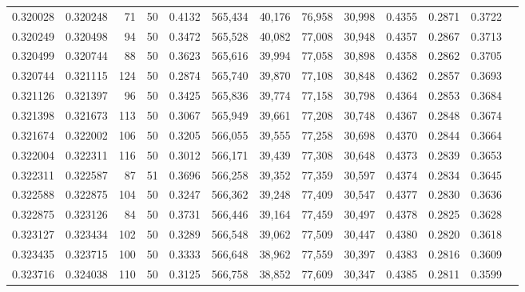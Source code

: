 \begin{tabular}{rrrrrrrrrrrrr}
0.320028 & 0.320248 &    71 &  50 &                                     0.4132 & 565,434 &  40,176 &  76,958 &  30,998 & 0.4355 & 0.2871 & 0.3722 \\
0.320249 & 0.320498 &    94 &  50 &                                     0.3472 & 565,528 &  40,082 &  77,008 &  30,948 & 0.4357 & 0.2867 & 0.3713 \\
0.320499 & 0.320744 &    88 &  50 &                                     0.3623 & 565,616 &  39,994 &  77,058 &  30,898 & 0.4358 & 0.2862 & 0.3705 \\
0.320744 & 0.321115 &   124 &  50 &                                     0.2874 & 565,740 &  39,870 &  77,108 &  30,848 & 0.4362 & 0.2857 & 0.3693 \\
0.321126 & 0.321397 &    96 &  50 &                                     0.3425 & 565,836 &  39,774 &  77,158 &  30,798 & 0.4364 & 0.2853 & 0.3684 \\
0.321398 & 0.321673 &   113 &  50 &                                     0.3067 & 565,949 &  39,661 &  77,208 &  30,748 & 0.4367 & 0.2848 & 0.3674 \\
0.321674 & 0.322002 &   106 &  50 &                                     0.3205 & 566,055 &  39,555 &  77,258 &  30,698 & 0.4370 & 0.2844 & 0.3664 \\
0.322004 & 0.322311 &   116 &  50 &                                     0.3012 & 566,171 &  39,439 &  77,308 &  30,648 & 0.4373 & 0.2839 & 0.3653 \\
0.322311 & 0.322587 &    87 &  51 &                                     0.3696 & 566,258 &  39,352 &  77,359 &  30,597 & 0.4374 & 0.2834 & 0.3645 \\
0.322588 & 0.322875 &   104 &  50 &                                     0.3247 & 566,362 &  39,248 &  77,409 &  30,547 & 0.4377 & 0.2830 & 0.3636 \\
0.322875 & 0.323126 &    84 &  50 &                                     0.3731 & 566,446 &  39,164 &  77,459 &  30,497 & 0.4378 & 0.2825 & 0.3628 \\
0.323127 & 0.323434 &   102 &  50 &                                     0.3289 & 566,548 &  39,062 &  77,509 &  30,447 & 0.4380 & 0.2820 & 0.3618 \\
0.323435 & 0.323715 &   100 &  50 &                                     0.3333 & 566,648 &  38,962 &  77,559 &  30,397 & 0.4383 & 0.2816 & 0.3609 \\
0.323716 & 0.324038 &   110 &  50 &                                     0.3125 & 566,758 &  38,852 &  77,609 &  30,347 & 0.4385 & 0.2811 & 0.3599 \\

\end{tabular}

